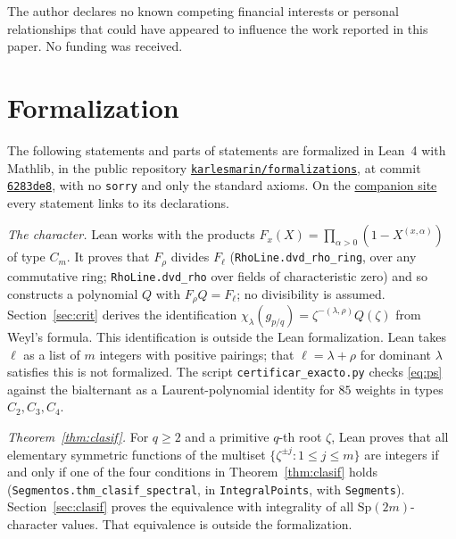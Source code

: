 \documentclass[11pt,a4paper]{article}
\theoremstyle{definition}
\newcommand{\Sp}{\mathrm{Sp}}
\begin{document}
\noindent The author declares no known competing financial interests or personal relationships that
could have appeared to influence the work reported in this paper. No funding was received.

\section*{Formalization}

\noindent The following statements and parts of statements are formalized in Lean~4 with Mathlib, in
the public repository
\href{https://github.com/karlesmarin/formalizations}{\texttt{karlesmarin/formalizations}}, at commit
\href{https://github.com/karlesmarin/formalizations/commit/6283de8ed4582c42d045e8b9e71b1a8512340c77}{\texttt{6283de8}}, with no \texttt{sorry} and only the standard axioms. On the
\href{https://karlesmarin.github.io/blueprints/characters-at-aP/}{companion site} every statement
links to its declarations.

\smallskip
\noindent \emph{The character.} Lean works with the products
$F_x(X)=\prod_{\alpha>0}(1-X^{(x,\alpha)})$ of type $C_m$. It proves that $F_\rho$ divides
$F_\ell$ (\texttt{RhoLine.}\allowbreak\texttt{dvd\_rho\_ring}, over any commutative ring;
\texttt{RhoLine.}\allowbreak\texttt{dvd\_rho} over fields of characteristic zero) and so constructs a
polynomial $Q$ with $F_\rho Q=F_\ell$; no divisibility is assumed. Section~\ref{sec:crit}
derives the identification $\chi_\lambda(g_{p/q})=\zeta^{-(\lambda,\rho)}Q(\zeta)$ from Weyl's
formula. This identification is outside the Lean formalization. Lean takes $\ell$ as a list of
$m$ integers with positive pairings; that $\ell=\lambda+\rho$ for dominant $\lambda$ satisfies this
is not formalized. The script
\texttt{certificar\_exacto.py} checks \eqref{eq:ps} against the bialternant as a Laurent-polynomial
identity for $85$ weights in types $C_2,C_3,C_4$.

\smallskip
\noindent \emph{Theorem~\ref{thm:clasif}.} For $q\ge2$ and a primitive $q$-th root $\zeta$, Lean
proves that all elementary symmetric functions of the multiset $\{\zeta^{\pm j}:1\le j\le m\}$ are
integers if and only if one of the four conditions in Theorem~\ref{thm:clasif} holds
(\texttt{Segmentos.}\allowbreak\texttt{thm\_clasif\_spectral}, in \texttt{IntegralPoints}, with \texttt{Segments}).
Section~\ref{sec:clasif} proves the equivalence with integrality of all $\Sp(2m)$-character values.
That equivalence is outside the formalization.
\end{document}
